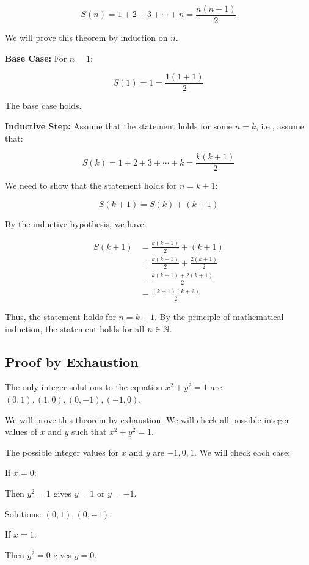 \[
	S(n) = 1 + 2 + 3 + \cdots + n = \frac{n(n+1)}{2}
\]

We will prove this theorem by induction on \(n\).

\textbf{Base Case:} For \( n = 1 \):

\[
	S(1) = 1 = \frac{1(1+1)}{2}
\]

The base case holds.

\textbf{Inductive Step:} Assume that the statement holds for some \( n = k \), i.e., assume that:
	
\[
	S(k) = 1 + 2 + 3 + \cdots + k = \frac{k(k+1)}{2}
\]
	
We need to show that the statement holds for \( n = k + 1 \):

\[
	S(k+1) = S(k) + (k + 1)
\]
	
By the inductive hypothesis, we have:

\begin{align*}
	S(k+1) &= \frac{k(k+1)}{2} + (k + 1) \\
	&= \frac{k(k+1)}{2} + \frac{2(k + 1)}{2}\\
    &= \frac{k(k+1) + 2(k + 1)}{2} \\
	&= \frac{(k + 1)(k + 2)}{2}	
\end{align*}

Thus, the statement holds for \( n = k + 1 \).
By the principle of mathematical induction, the statement holds for all \( n \in \mathbb{N} \).

\QED

\subsection{Proof by Exhaustion}

The only integer solutions to the equation \( x^2 + y^2 = 1 \) are \( (0, 1), (1, 0), (0, -1), (-1, 0) \).

We will prove this theorem by exhaustion. We will check all possible integer values of \(x\) and 
\(y\) such that \( x^2 + y^2 = 1 \).

The possible integer values for \(x\) and \(y\) are \( -1, 0, 1 \). We will check each case:

If \( x = 0 \):

Then \( y^2 = 1 \) gives \( y = 1 \) or \( y = -1 \).

Solutions: \( (0, 1), (0, -1) \).

If \( x = 1 \):

Then \( y^2 = 0 \) gives \( y = 0 \).

